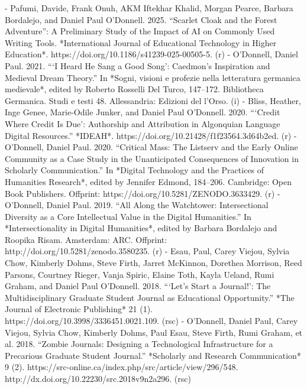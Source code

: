 - Pafumi, Davide\*, Frank Onuh\*, AKM Iftekhar Khalid\*, Morgan Pearce\*, Barbara Bordalejo, and Daniel Paul O'Donnell. 2025. “Scarlet Cloak and the Forest Adventure”: A Preliminary Study of the Impact of AI on Commonly Used Writing Tools. *International Journal of Educational Technology in Higher Education*. https:/\allowbreak{}/\allowbreak{}doi.org/\allowbreak{}10.1186/\allowbreak{}s41239-025-00505-5. (r)
- O’Donnell, Daniel Paul. 2021. “‘I Heard He Sang a Good Song’: Caedmon’s Inspiration and Medieval Dream Theory.” In *Sogni, visioni e profezie nella letteratura germanica medievale*, edited by Roberto Rosselli Del Turco, 147–172. Bibliotheca Germanica. Studi e testi 48. Allessandria: Edizioni del l’Orso. (i)
- Bliss, Heather, Inge Genee, Marie-Odile Junker, and Daniel Paul O’Donnell. 2020. “‘Credit Where Credit Is Due’: Authorship and Attribution in Algonquian Language Digital Resources.” *IDEAH*. https:/\allowbreak{}/\allowbreak{}doi.org/\allowbreak{}10.21428/\allowbreak{}f1f23564.3d64b2ed. (r)
- O’Donnell, Daniel Paul. 2020. “Critical Mass: The Listserv and the Early Online Community as a Case Study in the Unanticipated Consequences of Innovation in Scholarly Communication.” In *Digital Technology and the Practices of Humanities Research*, edited by Jennifer Edmond, 184–206. Cambridge: Open Book Publishers. Offprint: https:/\allowbreak{}/\allowbreak{}doi.org/\allowbreak{}10.5281/\allowbreak{}ZENODO.3633429. (r)
- O’Donnell, Daniel Paul. 2019. “All Along the Watchtower: Intersectional Diversity as a Core Intellectual Value in the Digital Humanities.” In *Intersectionality in Digital Humanities*, edited by Barbara Bordalejo and Roopika Risam. Amsterdam: ARC. Offprint: http:/\allowbreak{}/\allowbreak{}doi.org/\allowbreak{}10.5281/\allowbreak{}zenodo.3580235. (r)
- Esau, Paul\*, Carey Viejou\*, Sylvia Chow\*, Kimberly Dohms\*, Steve Firth\*, Jarret McKinnon\*, Dorethea Morrison\*, Reed Parsons\*, Courtney Rieger\*, Vanja Spiric\*, Elaine Toth\*, Kayla Ueland\*, Rumi Graham, and Daniel Paul O’Donnell. 2018. “‘Let’s Start a Journal!’: The Multidisciplinary Graduate Student Journal as Educational Opportunity.” *The Journal of Electronic Publishing* 21 (1). https:/\allowbreak{}/\allowbreak{}doi.org/\allowbreak{}10.3998/\allowbreak{}3336451.0021.109. (rsc)
- O’Donnell, Daniel Paul, Carey Viejou\*, Sylvia Chow\*, Kimberly Dohms\*, Paul Esau\*, Steve Firth\*, Rumi Graham, et al. 2018. “Zombie Journals: Designing a Technological Infrastructure for a Precarious Graduate Student Journal.” *Scholarly and Research Communication* 9 (2). https:/\allowbreak{}/\allowbreak{}src-online.ca/\allowbreak{}index.php/\allowbreak{}src/\allowbreak{}article/\allowbreak{}view/\allowbreak{}296/\allowbreak{}548. http:/\allowbreak{}/\allowbreak{}dx.doi.org/\allowbreak{}10.22230/\allowbreak{}src.2018v9n2a296. (rsc)

